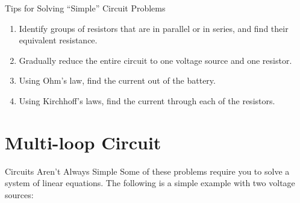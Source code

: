 \documentclass[12pt,aspectratio=169]{beamer}
\begin{document}
\begin{frame}{Tips for Solving ``Simple'' Circuit Problems}
  \begin{enumerate}
  \item Identify groups of resistors that are in parallel or in series, and
    find their equivalent resistance.
  \item Gradually reduce the entire circuit to one voltage source and one
    resistor.
  \item Using Ohm's law, find the current out of the battery.
  \item Using Kirchhoff's laws, find the current through each of the resistors.
  \end{enumerate}
\end{frame}




\section{Multi-loop Circuit}

\begin{frame}{Circuits Aren't Always Simple}
  Some of these problems require you to solve a system of linear equations.
  The following is a simple example with two voltage sources:
  \begin{center}
  \end{center}
\end{frame}
\end{document}
